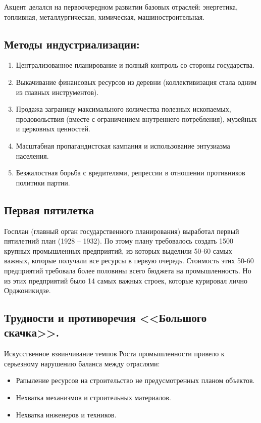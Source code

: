 Акцент делался на первоочередном развитии базовых отраслей: энергетика, топливная, металлургическая, химическая, машиностроительная. 

\subsection{Методы индустриализации:}

\begin{enumerate}
    \item Централизованное планирование и полный контроль со стороны государства.
    \item Выкачивание финансовых ресурсов из деревни (коллективизация стала одним из главных инструментов).
    \item Продажа заграницу максимального количества полезных ископаемых, продовольствия (вместе с ограничением внутреннего потребления), музейных и церковных ценностей.
    \item Масштабная пропагандистская кампания и использование энтузиазма населения.
    \item Безжалостная борьба с вредителями, репрессии в отношении противников политики партии.
\end{enumerate}

\subsection{Первая пятилетка}

Госплан (главный орган государственного планирования) выработал первый пятилетний план (1928 – 1932). По этому плану требовалось создать 1500 крупных промышленных предприятий, из которых выделили 50-60 самых важных, которые получали все ресурсы в первую очередь. Стоимость этих 50-60 предприятий требовала более половины всего бюджета на промышленность. Но из этих предприятий было 14 самых важных строек, которые курировал лично Орджоникидзе.

\subsection{Трудности и противоречия <<Большого скачка>>.}

Искусственное взвинчивание темпов Роста промышленности привело к серьезному нарушению баланса между отраслями:
\begin{itemize}
    \item Рапыление ресурсов на строительство не предусмотренных планом объектов.
    \item Нехватка механизмов и строительных материалов.
    \item Нехватка инженеров и техников.
    
\end{itemize}

